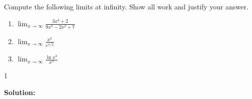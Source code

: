 \documentclass[9pt]{article}
\def\solutions{1}
\begin{document}
\fi

\newpage




\vspace{5mm}

\item Compute the following limits at infinity. Show all work and justify your answer.

\begin{enumerate}
\item $ \displaystyle \lim_{x \to \infty} \frac{3x^3 + 2}{9x^3 - 2x^2 +7} $
\item $ \displaystyle \lim_{x \to \infty} \frac{x^3}{e^{x/2}} $
\item $ \displaystyle \lim_{x \to \infty} \frac{\ln x^4}{x^3} $
\end{enumerate}

\if\solutions1
\vspace{2mm}

\textbf{Solution:} \\
			
\end{document}
